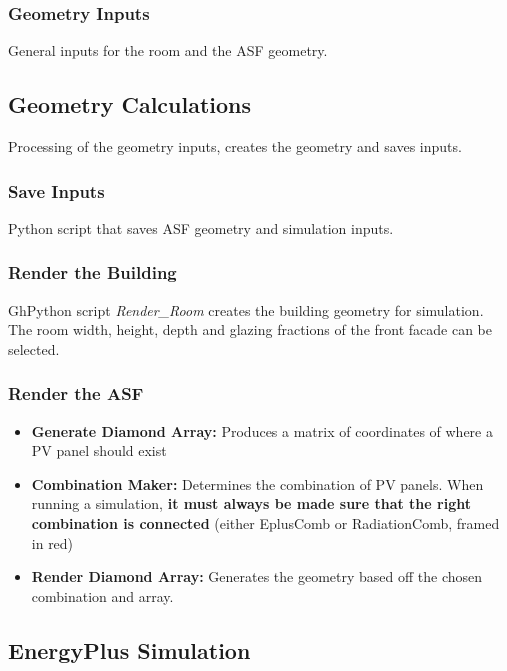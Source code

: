 	\subsubsection{Geometry Inputs}
	General inputs for the room and the ASF geometry. 

	\subsection{Geometry Calculations}
	Processing of the geometry inputs, creates the geometry and saves inputs.
	\subsubsection{Save Inputs}
	Python script that saves ASF geometry and simulation inputs.

	\subsubsection{Render the Building}
	GhPython script \emph{Render\_Room} creates the building geometry for simulation. The room width, height, depth and glazing fractions of the front facade can be selected.

	\subsubsection{Render the ASF}
	\begin{itemize}
	\item{{\bf Generate Diamond Array:} Produces a matrix of coordinates of where a PV panel should exist}
	\item{{\bf Combination Maker:} Determines the combination of PV panels. When running a simulation, {\bf it must always be made sure that the right combination is connected} (either EplusComb or RadiationComb, framed in red)}
	\item{{\bf Render Diamond Array:} Generates the geometry based off the chosen combination and array.}
	\end{itemize}

	\subsection{EnergyPlus Simulation}

